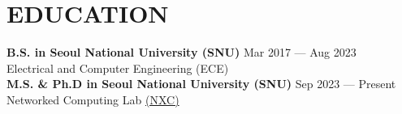 \section*{EDUCATION}

\noindent
\textbf{B.S. in Seoul National University (SNU)} \hfill Mar 2017 --- Aug 2023 \\
Electrical and Computer Engineering (ECE) \\

\noindent
\textbf{M.S. \& Ph.D in Seoul National University (SNU)} \hfill Sep 2023 --- Present \\
Networked Computing Lab \href{https://nxc.snu.ac.kr}{(NXC)} \\

